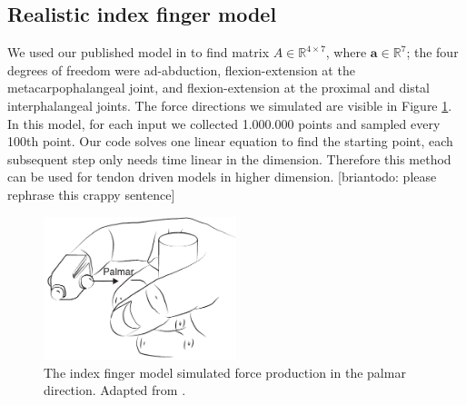 \subsection{Realistic index finger model}
\label{ss:finger}
We used our published model in \cite{Valero-Cuevas1998Large} to find matrix $A \in \mathbb{R}^{4 \times 7}$, where $\textbf{a} \in \mathbb{R}^7$; the four degrees of freedom were ad-abduction, flexion-extension at the metacarpophalangeal joint, and flexion-extension at the proximal and distal interphalangeal joints.
The force directions we simulated are visible in Figure \ref{fig:finger}. In this model, for each input we collected 1.000.000 points and sampled every 100th point. Our code solves one linear equation to find the starting point, each subsequent step only needs time linear in the dimension. Therefore this method can be used for tendon driven models in higher dimension. [briantodo: please rephrase this crappy sentence] 

\begin{figure}[htbp]
  \centering
  \includegraphics[width=0.5\textwidth]{sections/figs/finger.pdf}
  \caption{The index finger model simulated force production in the palmar direction. Adapted from \cite{Valero-Cuevas1998Large}.}
  \label{fig:finger}
\end{figure}



